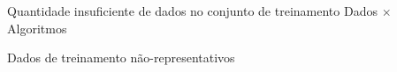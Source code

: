 \documentclass[12pt,mathserif,aspectratio=169]{beamer}
\begin{document}
\begin{frame}{Quantidade insuficiente de dados no conjunto de treinamento}
{        Dados $\times$ Algoritmos
	}
	
\end{frame}

\begin{frame}
	\Huge Dados de treinamento não-representativos
\end{frame}
\end{document}
